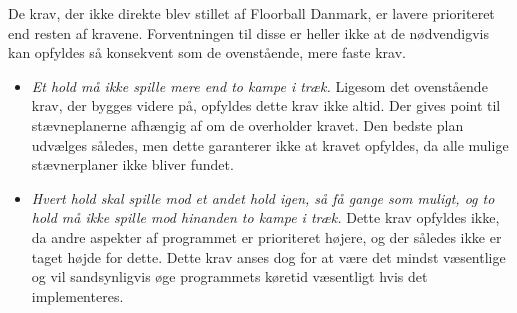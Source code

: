 De krav, der ikke direkte blev stillet af Floorball Danmark, er lavere prioriteret end resten af kravene. Forventningen til disse er heller ikke at de nødvendigvis kan opfyldes så konsekvent som de ovenstående, mere faste krav. 
\begin{itemize}
    \item \textit{Et hold må ikke spille mere end to kampe i træk.} Ligesom det ovenstående krav, der bygges videre på, opfyldes dette krav ikke altid. Der gives point til stævneplanerne afhængig af om de overholder kravet. Den bedste plan udvælges således, men dette garanterer ikke at kravet opfyldes, da alle mulige stævnerplaner ikke bliver fundet.
    \item \textit{Hvert hold skal spille mod et andet hold igen, så få gange som muligt, og to hold må ikke spille mod hinanden to kampe i træk.} Dette krav opfyldes ikke, da andre aspekter af programmet er prioriteret højere, og der således ikke er taget højde for dette. Dette krav anses dog for at være det mindst væsentlige og vil sandsynligvis øge programmets køretid væsentligt hvis det implementeres. 
\end{itemize}

